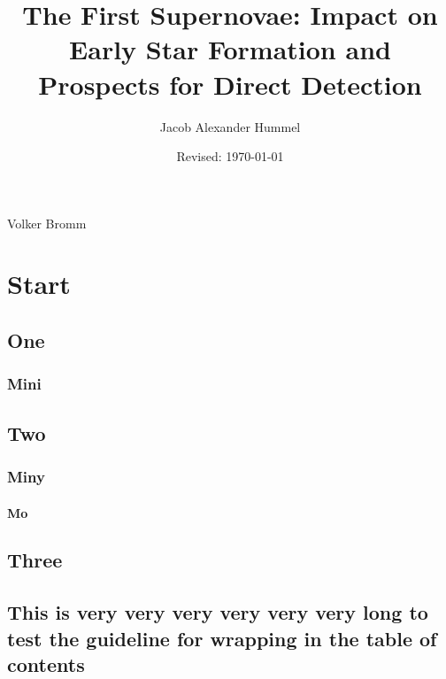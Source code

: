 \documentclass{utthesis}
\begin{document}
\author{Jacob Alexander Hummel} 
\title{The First Supernovae: Impact on Early Star Formation and Prospects for Direct Detection} 
\date{Revised: \today}

\UTcopyrightlegend %

\begin{UTcommittee}
\end{UTcommittee}


\frontmatter

\setcounter{page}{4}

%
%

\begin{UTabstract}{Volker Bromm}
\lipsum[1]
\end{UTabstract}


\tableofcontents

\listoffigures

\mainmatter

\chapter{Start}
\lipsum[3]
\section{One}
\subsection{Mini}
\section{Two}
\subsection{Miny}
\subsubsection{Mo}
\section{Three}
\section{This is very very very very very very long to test the guideline for wrapping in the table of contents}
\end{document}
